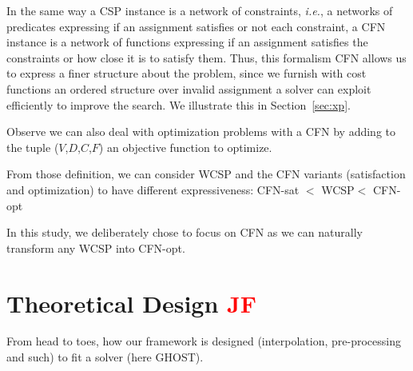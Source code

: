 \documentclass{article}
\newcommand{\ie}{\textit{i.e.}}
\newcommand{\csp}{\textsc{CSP}\xspace}
\newcommand{\cfn}{\textsc{CFN}\xspace}
\newcommand{\wcsp}{\textsc{WCSP}\xspace}
\newcommand{\jf}{\textcolor{red}{\bf JF}\xspace}
\begin{document}
In the same  way a \csp instance  is a network of  constraints, \ie, a
networks of  predicates expressing if  an assignment satisfies  or not
each constraint, a \cfn instance  is a network of functions expressing
if  an assignment  satisfies the  constraints or  how close  it is  to
satisfy them. Thus,  this formalism \cfn allows us to  express a finer
structure about the  problem, since we furnish with  cost functions an
ordered  structure  over  invalid  assignment  a  solver  can  exploit
efficiently   to   improve  the   search.   We   illustrate  this   in
Section~\ref{sec:xp}.

Observe we  can also deal  with optimization  problems with a  \cfn by
adding  to  the  tuple  ($V$,$D$,$C$,$F$)  an  objective  function  to
optimize.




From those  definition, we  can consider \wcsp  and the  \cfn variants
(satisfaction  and  optimization)  to have  different  expressiveness:
\cfn-sat $<$ \wcsp $<$ \cfn-opt

In  this study,  we deliberately  chose  to focus  on \cfn  as we  can
naturally transform any \wcsp into \cfn-opt.

\section{Theoretical Design \jf}\label{sec:theory}
From  head to  toes,  how our  framework  is designed  (interpolation,
pre-processing and such) to fit a solver (here GHOST).
\end{document}
